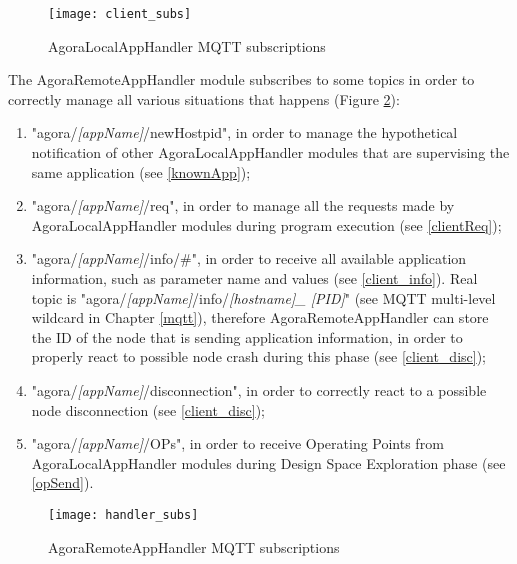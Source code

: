 \begin{figure}[t]

    \centering
    \texttt{[image: client\_subs]}
    \caption{AgoraLocalAppHandler MQTT subscriptions}

    \label{fig::localSubs}
    
\end{figure}

The AgoraRemoteAppHandler module subscribes to some topics in order to correctly manage all various situations that happens (Figure \ref{fig::remotSubs}):

\begin{enumerate}

    \item "agora/\textit{[appName]}/newHostpid", in order to manage the hypothetical notification of other AgoraLocalAppHandler modules that are supervising the same application (see \ref{knownApp});
    
    \item "agora/\textit{[appName]}/req", in order to manage all the requests made by AgoraLocalAppHandler modules during program execution (see \ref{clientReq});
    
    \item "agora/\textit{[appName]}/info/\#", in order to receive all available application information, such as parameter name and values (see \ref{client_info}). Real topic is "agora\slash{}\textit{[appName]}\slash{}info\slash{}\textit{[host\-name]\_ [PID]}" (see MQTT multi-level wildcard in Chapter \ref{mqtt}), therefore Agora\-Remote\-App\-Handler can store the ID of the node that is sending application information, in order to properly react to possible node crash during this phase (see \ref{client_disc});
    
    \item "agora/\textit{[appName]}/disconnection", in order to correctly react to a possible node disconnection (see \ref{client_disc});
    
    \item "agora/\textit{[appName]}/OPs", in order to receive Operating Points from AgoraLocalAppHandler modules during Design Space Exploration phase (see \ref{opSend}).

\end{enumerate}

\begin{figure}[t]

    \centering
    \texttt{[image: handler\_subs]}
    \caption{AgoraRemoteAppHandler MQTT subscriptions}

    \label{fig::remotSubs}
    
\end{figure}


